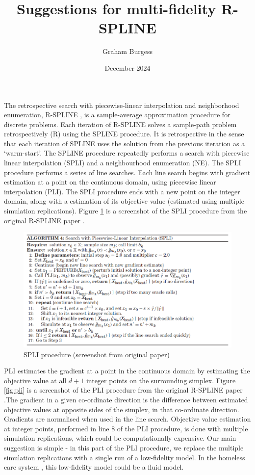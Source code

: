 \documentclass[12pt,a4paper]{article}
\title{Suggestions for multi-fidelity R-SPLINE}
\author{Graham Burgess}
\date{December 2024}
\begin{document}
%
\maketitle

The retrospective search with piecewise-linear interpolation and neighborhood enumeration, R-SPLINE \citep{wang2013integer}, is a sample-average approximation procedure for discrete problems. Each iteration of R-SPLINE solves a sample-path problem retrospectively (R) using the SPLINE procedure. It is retrospective in the sense that each iteration of SPLINE uses the solution from the previous iteration as a `warm-start'. The SPLINE procedure repeatedly performs a search with piecewise linear interpolation (SPLI) and a neighbourhood enumeration (NE). The SPLI procedure performs a series of line searches. Each line search begins with gradient estimation at a point on the continuous domain, using piecewise linear interpolation (PLI). The SPLI procedure ends with a new point on the integer domain, along with a estimation of its objective value (estimated using multiple simulation replications). Figure \ref{fig:spli} is a screenshot of the SPLI procedure from the original R-SPLINE paper \citep{wang2013integer}. 

\begin{figure}
  \centering
  \includegraphics[scale=0.7]{spli.png}
  \caption{SPLI procedure (screenshot from original paper)}
  \label{fig:spli}
\end{figure}

PLI estimates the gradient at a point in the continuous domain by estimating the objective value at all $d + 1$ integer points on the surrounding simplex. Figure \ref{fig:pli} is a screenshot of the PLI procedure from the original R-SPLINE paper \citep{wang2013integer}.The gradient in a given co-ordinate direction is the difference between estimated objective values at opposite sides of the simplex, in that co-ordinate direction. Gradients are normalised when used in the line search. Objective value estimation at integer points, performed in line 8 of the PLI procedure, is done with multiple simulation replications, which could be computationally expensive. Our main suggestion is simple - in this part of the PLI procedure, we replace the multiple simulation replications with a single run of a low-fidelity model. In the homeless care system \citep{burgess2024time}, this low-fidelity model could be a fluid model.
\end{document}
